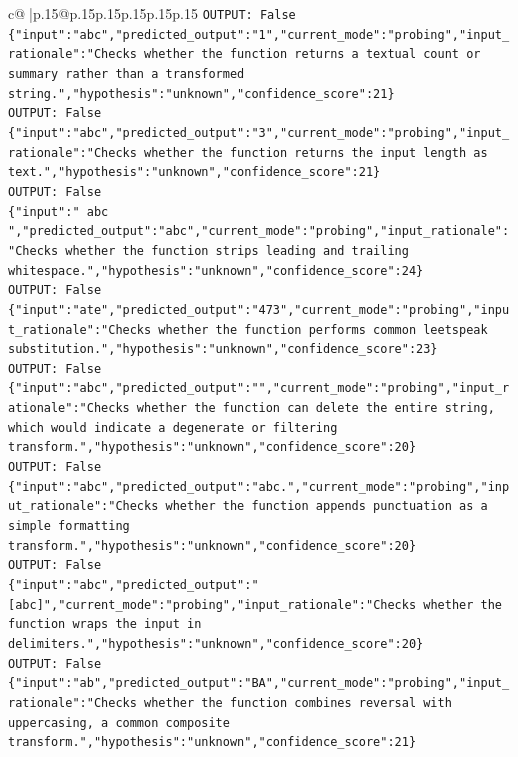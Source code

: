 \documentclass{article}
\begin{document}
{\begin{supertabular}{c@{$\;$}|p{.15\linewidth}@{}p{.15\linewidth}p{.15\linewidth}p{.15\linewidth}p{.15\linewidth}p{.15\linewidth}}
{{{\texttt{OUTPUT: False} \\
\texttt{\{"input":"abc","predicted\_output":"1","current\_mode":"probing","input\_rationale":"Checks whether the function returns a textual count or summary rather than a transformed string.","hypothesis":"unknown","confidence\_score":21\}} \\
\texttt{OUTPUT: False} \\
\texttt{\{"input":"abc","predicted\_output":"3","current\_mode":"probing","input\_rationale":"Checks whether the function returns the input length as text.","hypothesis":"unknown","confidence\_score":21\}} \\
\texttt{OUTPUT: False} \\
\texttt{\{"input":" abc ","predicted\_output":"abc","current\_mode":"probing","input\_rationale":"Checks whether the function strips leading and trailing whitespace.","hypothesis":"unknown","confidence\_score":24\}} \\
\texttt{OUTPUT: False} \\
\texttt{\{"input":"ate","predicted\_output":"473","current\_mode":"probing","input\_rationale":"Checks whether the function performs common leetspeak substitution.","hypothesis":"unknown","confidence\_score":23\}} \\
\texttt{OUTPUT: False} \\
\texttt{\{"input":"abc","predicted\_output":"","current\_mode":"probing","input\_rationale":"Checks whether the function can delete the entire string, which would indicate a degenerate or filtering transform.","hypothesis":"unknown","confidence\_score":20\}} \\
\texttt{OUTPUT: False} \\
\texttt{\{"input":"abc","predicted\_output":"abc.","current\_mode":"probing","input\_rationale":"Checks whether the function appends punctuation as a simple formatting transform.","hypothesis":"unknown","confidence\_score":20\}} \\
\texttt{OUTPUT: False} \\
\texttt{\{"input":"abc","predicted\_output":"{[}abc{]}","current\_mode":"probing","input\_rationale":"Checks whether the function wraps the input in delimiters.","hypothesis":"unknown","confidence\_score":20\}} \\
\texttt{OUTPUT: False} \\
\texttt{\{"input":"ab","predicted\_output":"BA","current\_mode":"probing","input\_rationale":"Checks whether the function combines reversal with uppercasing, a common composite transform.","hypothesis":"unknown","confidence\_score":21\}} \\
}}}
\end{supertabular}}
\end{document}
